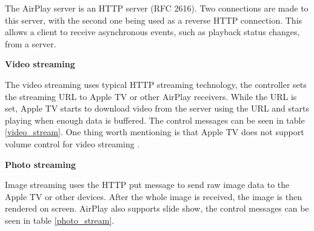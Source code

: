 The AirPlay server is an HTTP server (RFC 2616). Two connections are made to this 
server, with the second one being used as a reverse HTTP connection. This allows a 
client to receive asynchronous events, such as playback status changes, from a 
server.

\textbf{Video streaming}

The video streaming uses typical HTTP streaming technology, the controller sets 
the streaming URL to Apple TV or other AirPlay receivers. While the URL is set, 
Apple TV starts to download video from the server using the URL and starts 
playing when enough data is buffered. The control messages can be seen in 
table \ref{video_stream}. One thing worth mentioning is that Apple TV does
not support volume control for video streaming \cite{AirPlay-spec}.

\begin{table}[htb] 
\caption{AirPlay Video Control HTTP requests \label{video_stream}} 
\begin{center} 
\end{center} 
\end{table} 

\textbf{Photo streaming}

Image streaming uses the HTTP put message to send raw image data to the Apple TV or 
other devices. After the whole image is received, the image is then rendered on 
screen. AirPlay also supports slide show, the control messages can be seen in 
table \ref{photo_stream}.

